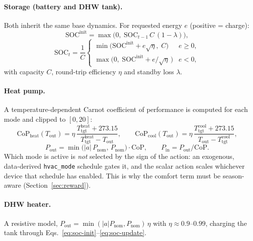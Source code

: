 \documentclass[11pt]{article}
\begin{document}
\paragraph{Storage (battery and DHW tank).} Both inherit the same base dynamics.
For requested energy $e$ (positive = charge):
\begin{equation}
\text{SOC}^{\text{init}} = \max\!\big(0,\; \text{SOC}_{t-1}\, C\, (1-\lambda)\big),
\label{eq:soc-init}
\end{equation}
\begin{equation}
\text{SOC}_t = \frac{1}{C}\begin{cases}
\min\big(\text{SOC}^{\text{init}} + e\sqrt{\eta},\; C\big) & e \geq 0, \\[4pt]
\max\big(0,\; \text{SOC}^{\text{init}} + e/\sqrt{\eta}\,\big) & e < 0,
\end{cases}
\label{eq:soc-update}
\end{equation}
with capacity $C$, round-trip efficiency $\eta$ and standby loss $\lambda$.

\paragraph{Heat pump.} A temperature-dependent Carnot coefficient of performance
is computed for each mode and clipped to $[0,20]$:
\begin{equation}
\text{CoP}_{\text{heat}}(T_{\text{out}}) = \eta\,\frac{T^{\text{heat}}_{\text{tgt}} + 273.15}{T^{\text{heat}}_{\text{tgt}} - T_{\text{out}}},
\qquad
\text{CoP}_{\text{cool}}(T_{\text{out}}) = \eta\,\frac{T^{\text{cool}}_{\text{tgt}} + 273.15}{T_{\text{out}} - T^{\text{cool}}_{\text{tgt}}},
\label{eq:cop}
\end{equation}
\begin{equation}
P_{\text{out}} = \min\!\big(|a|\,P_{\text{nom}},\, P_{\text{nom}}\big)\cdot \text{CoP}, \qquad
P_{\text{in}} = P_{\text{out}} / \text{CoP}.
\label{eq:hp-power}
\end{equation}
Which mode is active is \emph{not} selected by the sign of the action: an
exogenous, data-derived \texttt{hvac\_mode} schedule gates it, and the scalar
action scales whichever device that schedule has enabled. This is why the
comfort term must be season-aware (Section~\ref{sec:reward}).

\paragraph{DHW heater.} A resistive model,
$P_{\text{out}} = \min(|a| P_{\text{nom}}, P_{\text{nom}})\,\eta$ with
$\eta \approx 0.9$--$0.99$, charging the tank through
Eqs.~\ref{eq:soc-init}--\ref{eq:soc-update}.
\end{document}
